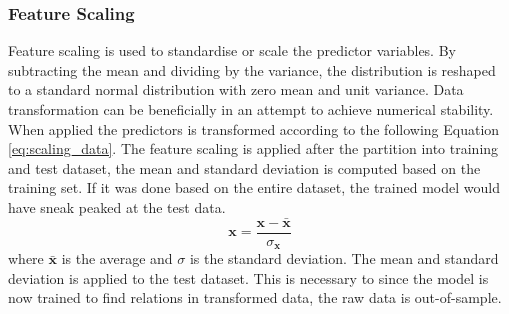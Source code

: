 


\subsubsection{Feature Scaling} \label{sec:scaling_predictors}

Feature scaling is used to standardise or scale the predictor variables. By subtracting the mean and dividing by the variance, the distribution is reshaped to a standard normal distribution with zero mean and unit variance. Data transformation can be beneficially in an attempt to achieve numerical stability. When applied the predictors is transformed according to the following Equation \ref{eq:scaling_data}. The feature scaling is applied after the partition into training and test dataset, the mean and standard deviation is computed based on the training set. If it was done based on the entire dataset, the trained model would have sneak peaked at the test data.
\begin{equation} \label{eq:scaling_data}
    \mathbf{x} = \frac{\mathbf{x} - \bar{\mathbf{x}}}{\sigma_{\mathbf{x}}}
\end{equation}
where $\bar{\mathbf{x}}$ is the average and $\sigma$ is the standard deviation.
The mean and standard deviation is applied to the test dataset. This is necessary to since the model is now trained to find relations in transformed data, the raw data is out-of-sample.

